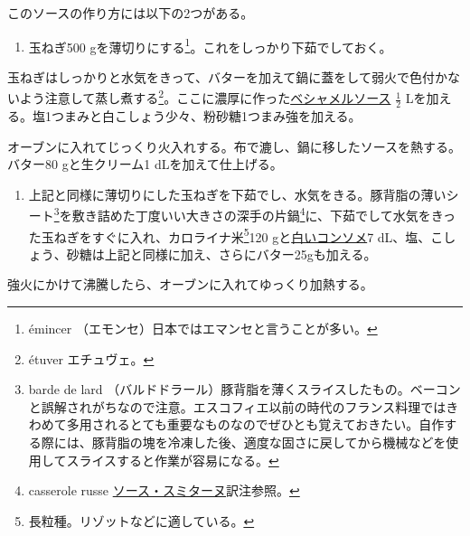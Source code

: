 \begin{recette}


このソースの作り方には以下の2つがある。

\begin{enumerate}
\def\labelenumi{\arabic{enumi}.}
\tightlist
\item
  玉ねぎ500 gを薄切りにする\footnote{émincer
    （エモンセ）日本ではエマンセと言うことが多い。}。これをしっかり下茹でしておく。
\end{enumerate}

玉ねぎはしっかりと水気をきって、バターを加えて鍋に蓋をして弱火で色付かないよう注意して蒸し煮する\footnote{étuver
  エチュヴェ。}。ここに濃厚に作った\protect\hyperlink{sauce-bechamel}{ベシャメルソース}
\(\frac{1}{2}\)
Lを加える。塩1つまみと白こしょう少々、粉砂糖1つまみ強を加える。

オーブンに入れてじっくり火入れする。布で漉し、鍋に移したソースを熱する。バター80
gと生クリーム1 dLを加えて仕上げる。

\begin{enumerate}
\def\labelenumi{\arabic{enumi}.}
\setcounter{enumi}{1}
\tightlist
\item
  上記と同様に薄切りにした玉ねぎを下茹でし、水気をきる。豚背脂の薄いシート\footnote{barde
    de lard
    （バルドドラール）豚背脂を薄くスライスしたもの。ベーコンと誤解されがちなので注意。エスコフィエ以前の時代のフランス料理ではきわめて多用されるとても重要なものなのでぜひとも覚えておきたい。自作する際には、豚背脂の塊を冷凍した後、適度な固さに戻してから機械などを使用してスライスすると作業が容易になる。}を敷き詰めた丁度いい大きさの深手の片鍋\footnote{casserole
    russe
    \protect\hyperlink{sauce-smitane}{ソース・スミターヌ}訳注参照。}に、下茹でして水気をきった玉ねぎをすぐに入れ、カロライナ米\footnote{長粒種。リゾットなどに適している。}120
  gと\protect\hyperlink{consomme-blanc}{白いコンソメ}7
  dL、塩、こしょう、砂糖は上記と同様に加え、さらにバター25gも加える。
\end{enumerate}

強火にかけて沸騰したら、オーブンに入れてゆっくり加熱する。


\end{recette}
